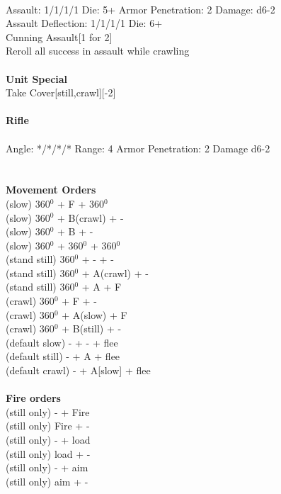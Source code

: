 \ \\
Assault: 1/1/1/1 Die: 5+ Armor Penetration: 2 Damage: d6-2 \\
Assault Deflection: 1/1/1/1 Die: 6+\\
\indent Cunning Assault[1 for 2]\\ Reroll all success in assault while crawling \\
\ \\

{\bf Unit Special} \\
Take Cover[still,crawl][-2]
\ \\
\ \\
{\bf Rifle } \\
\ \\
Angle: */*/*/* Range: 4 Armor Penetration: 2 Damage d6-2 \\
\indent  \\





\ \\ {\bf Movement Orders } \\
(slow) 360$^0$ + F + 360$^0$ \\
(slow) 360$^0$ + B(crawl) + - \\
(slow) 360$^0$ + B + - \\
(slow) 360$^0$ + 360$^0$ + 360$^0$ \\
(stand still) 360$^0$ + - + -  \\
(stand still) 360$^0$ + A(crawl) + - \\
(stand still) 360$^0$ + A + F \\
(crawl) 360$^0$ + F + - \\
(crawl) 360$^0$ + A(slow) + F \\
(crawl) 360$^0$ + B(still) + - \\
(default slow) - + - + flee \\
(default still) - + A + flee \\
(default crawl) - + A[slow] + flee \\
\ \\ {\bf Fire orders } \\
(still only) - + Fire \\
(still only) Fire + -  \\
(still only) - + load \\
(still only) load + - \\
(still only) - + aim \\
(still only) aim + -  \\



